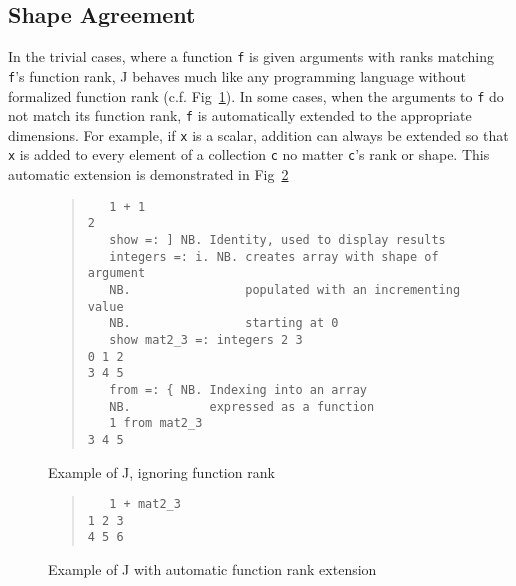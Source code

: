 \subsection{Shape Agreement}
In the trivial cases, where a function \texttt{f} is given arguments with ranks matching \texttt{f}'s function rank, 
J behaves much like any programming language without formalized function rank (c.f. Fig~\ref{fig:j-ig-fr}). 
In some cases, when the arguments to \texttt{f} do not match its function rank, 
\texttt{f} is automatically extended to the appropriate dimensions.
For example, if \texttt{x} is a scalar, addition can always be extended 
so that \texttt{x} is added to every element of a collection \texttt{c} no matter \texttt{c}'s rank or shape. 
This automatic extension is demonstrated in Fig~\ref{fig:j-def-fr}


\begin{figure}[htbp]
\begin{quote}
\HRule
\begin{singlespacing}
\begin{small}
\begin{verbatim}
   1 + 1
2
   show =: ] NB. Identity, used to display results
   integers =: i. NB. creates array with shape of argument
   NB.                populated with an incrementing value
   NB.                starting at 0
   show mat2_3 =: integers 2 3
0 1 2
3 4 5
   from =: { NB. Indexing into an array
   NB.           expressed as a function
   1 from mat2_3
3 4 5
\end{verbatim}
\end{small}
\end{singlespacing}
\HRule
\end{quote}
\caption{Example of J, ignoring function rank}
\label{fig:j-ig-fr}
\end{figure}

\begin{figure}[htbp]
\begin{quote}
\HRule
\begin{singlespacing}
\begin{small}
\begin{verbatim}
   1 + mat2_3
1 2 3
4 5 6
\end{verbatim}
\end{small}
\end{singlespacing}
\HRule
\caption{Example of J with automatic function rank extension}
\label{fig:j-def-fr}
\end{quote}
\end{figure}

